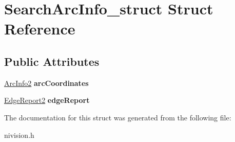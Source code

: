 \hypertarget{structSearchArcInfo__struct}{\section{\-Search\-Arc\-Info\-\_\-struct \-Struct \-Reference}
\label{structSearchArcInfo__struct}
}
\subsection*{\-Public \-Attributes}
\begin{DoxyCompactItemize}
\item 
\hypertarget{structSearchArcInfo__struct_aeee592f6eb7105576f9f82f43329e97a}{\hyperlink{structArcInfo2__struct}{\-Arc\-Info2} {\bfseries arc\-Coordinates}}\label{structSearchArcInfo__struct_aeee592f6eb7105576f9f82f43329e97a}

\item 
\hypertarget{structSearchArcInfo__struct_a35e3ab8e1bcd86c4c07a72321539d386}{\hyperlink{structEdgeReport2__struct}{\-Edge\-Report2} {\bfseries edge\-Report}}\label{structSearchArcInfo__struct_a35e3ab8e1bcd86c4c07a72321539d386}

\end{DoxyCompactItemize}


\-The documentation for this struct was generated from the following file\-:\begin{DoxyCompactItemize}
\item 
nivision.\-h\end{DoxyCompactItemize}
